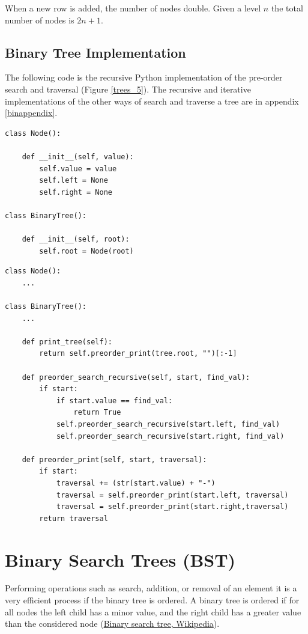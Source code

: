 When a new row is added, the number of nodes double. Given a level \(n\) the total number of nodes is \(2n + 1\).

\subsection{Binary Tree Implementation}
The following code is the recursive Python implementation of the pre-order search and traversal (Figure \ref{trees_5}). The recursive and iterative implementations of the other ways of search and traverse a tree are in appendix \ref{binappendix}.

\begin{lstlisting}[firstnumber=1, caption={Class definition for a node and a tree.}]
class Node():

	def __init__(self, value):
		self.value = value
		self.left = None
		self.right = None

class BinaryTree():

	def __init__(self, root):
		self.root = Node(root)
\end{lstlisting}

\begin{lstlisting}[firstnumber=1, caption={Recursive pre-order traversal and search implementation.}]
class Node():
	...

class BinaryTree():
	...

	def print_tree(self):
		return self.preorder_print(tree.root, "")[:-1]

	def preorder_search_recursive(self, start, find_val):
		if start:
			if start.value == find_val:
				return True
			self.preorder_search_recursive(start.left, find_val)
			self.preorder_search_recursive(start.right, find_val)	
	
	def preorder_print(self, start, traversal):
		if start:
			traversal += (str(start.value) + "-")
			traversal = self.preorder_print(start.left, traversal)
			traversal = self.preorder_print(start.right,traversal)
		return traversal
\end{lstlisting}

\section{Binary Search Trees (BST)}
Performing operations such as search, addition, or removal of an element it is a very efficient process if the binary tree is ordered. A binary tree is ordered if for all nodes the left child has a minor value, and the right child has a greater value than the considered node \cite{wikibinsearchtree}(\href{https://en.wikipedia.org/wiki/Binary_search_tree}{Binary search tree, Wikipedia}).

